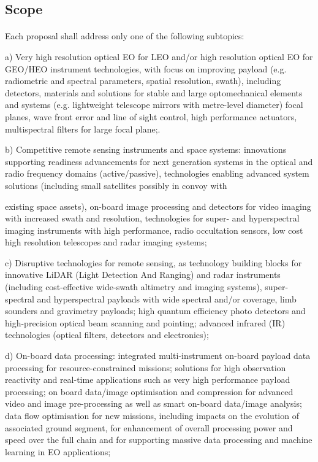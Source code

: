 \subsection{Scope}
\paragraph{}Each proposal shall address only one of the following subtopics:

a) Very high resolution optical EO for LEO and/or high resolution optical EO for GEO/HEO instrument technologies, with focus on improving payload (e.g. radiometric and spectral parameters, spatial resolution, swath), including detectors, materials and solutions for stable and large optomechanical elements and systems (e.g. lightweight telescope mirrors with metre-level diameter) focal planes, wave front error and line of sight control, high performance actuators, multispectral filters for large focal plane;.

b) Competitive remote sensing instruments and space systems: innovations supporting readiness advancements for next generation systems in the optical and radio frequency domains (active/passive), technologies enabling advanced system solutions (including small satellites possibly in convoy with 

existing space assets), on-board image processing and detectors for video imaging with increased swath and resolution, technologies for super- and hyperspectral imaging instruments with high performance, radio occultation sensors, low cost high resolution telescopes and radar imaging systems;

c) Disruptive technologies for remote sensing, as technology building blocks for innovative LiDAR (Light Detection And Ranging) and radar instruments (including cost-effective wide-swath altimetry and imaging systems), super-spectral and hyperspectral payloads with wide spectral and/or coverage, limb sounders and gravimetry payloads; high quantum efficiency photo detectors and high-precision optical beam scanning and pointing; advanced infrared (IR) technologies (optical filters, detectors and electronics);

d) On-board data processing: integrated multi-instrument on-board payload data processing for resource-constrained missions; solutions for high observation reactivity and real-time applications such as very high performance payload processing; on board data/image optimisation and compression for advanced video and image pre-processing as well as smart on-board data/image analysis; data flow optimisation for new missions, including impacts on the evolution of associated ground segment, for enhancement of overall processing power and speed over the full chain and for supporting massive data processing and machine learning in EO applications;

